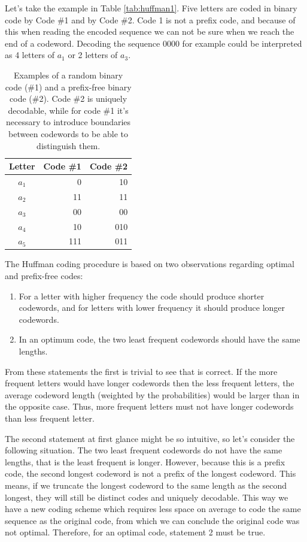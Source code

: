 \documentclass{diploma_style}
\begin{document}
Let's take the example in Table \ref{tab:huffman1}. Five letters are coded in binary code by Code \#1 and by Code \#2. Code 1 is not a prefix code, and because of this when reading the encoded sequence we can not be sure when we reach the end of a codeword. Decoding the sequence 0000 for example could be interpreted as 4 letters of $a_1$ or 2 letters of $a_3$.

\begin{table}
\caption{Examples of a random binary code (\#1) and a prefix-free binary code (\#2). Code \#2 is uniquely decodable, while for code \#1 it's necessary to introduce boundaries between codewords to be able to distinguish them.}
\centering
\begin{tabular}{crr}
\toprule
Letter & Code \#1 & Code \#2 \\
\midrule
$a_1$ & 0	& 10 \\
$a_2$ & 11	& 11 \\
$a_3$ & 00	& 00 \\
$a_4$ & 10 	& 010 \\
$a_5$ & 111	& 011 \\
\bottomrule
\end{tabular}
\label{tab:prefix}
\end{table}

The Huffman coding procedure is based on two observations regarding optimal and prefix-free codes:
\begin{enumerate}
\item For a letter with higher frequency the code should produce shorter codewords, and for letters with lower frequency it should produce longer codewords.
\item In an optimum code, the two least frequent codewords should have the same lengths.
\end{enumerate}

From these statements the first is trivial to see that is correct. If the more frequent letters would have longer codewords then the less frequent letters, the average codeword length (weighted by the probabilities) would be larger than in the opposite case. Thus, more frequent letters must not have longer codewords than less frequent letter.

The second statement at first glance might be so intuitive, so let's consider the following situation. The two least frequent codewords do not have the same lengths, that is the least frequent is longer. However, because this is a prefix code, the second longest codeword is not a prefix of the longest codeword. This means, if we truncate the longest codeword to the same length as the second longest, they will still be distinct codes and uniquely decodable. This way we have a new coding scheme which requires less space on average to code the same sequence as the original code, from which we can conclude the original code was not optimal. Therefore, for an optimal code, statement 2 must be true.
\end{document}
